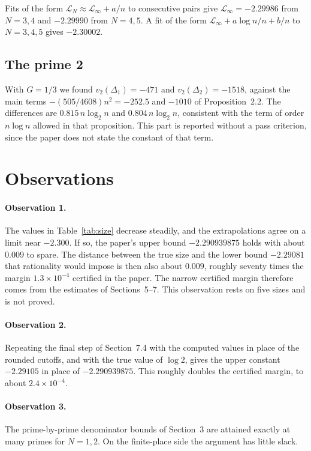 \documentclass[11pt]{article}
\begin{document}
Fits of the form $\mathcal{L}_N\approx\mathcal{L}_\infty+a/n$ to consecutive pairs give $\mathcal{L}_\infty=-2.29986$ from $N=3,4$ and $-2.29990$ from $N=4,5$. A fit of the form $\mathcal{L}_\infty+a\log n/n+b/n$ to $N=3,4,5$ gives $-2.30002$.

\subsection{The prime 2}

With $G=1/3$ we found $v_2(\Delta_1)=-471$ and $v_2(\Delta_2)=-1518$, against the main terms $-(505/4608)n^2=-252.5$ and $-1010$ of Proposition~2.2. The differences are $0.815\,n\log_2 n$ and $0.804\,n\log_2 n$, consistent with the term of order $n\log n$ allowed in that proposition. This part is reported without a pass criterion, since the paper does not state the constant of that term.

\section{Observations}

\paragraph{Observation 1.} The values in Table~\ref{tab:size} decrease steadily, and the extrapolations agree on a limit near $-2.300$. If so, the paper's upper bound $-2.290939875$ holds with about $0.009$ to spare. The distance between the true size and the lower bound $-2.29081$ that rationality would impose is then also about $0.009$, roughly seventy times the margin $1.3\times10^{-4}$ certified in the paper. The narrow certified margin therefore comes from the estimates of Sections~5--7. This observation rests on five sizes and is not proved.

\paragraph{Observation 2.} Repeating the final step of Section~7.4 with the computed values in place of the rounded cutoffs, and with the true value of $\log 2$, gives the upper constant $-2.29105$ in place of $-2.290939875$. This roughly doubles the certified margin, to about $2.4\times10^{-4}$.

\paragraph{Observation 3.} The prime-by-prime denominator bounds of Section~3 are attained exactly at many primes for $N=1,2$. On the finite-place side the argument has little slack.
\end{document}

